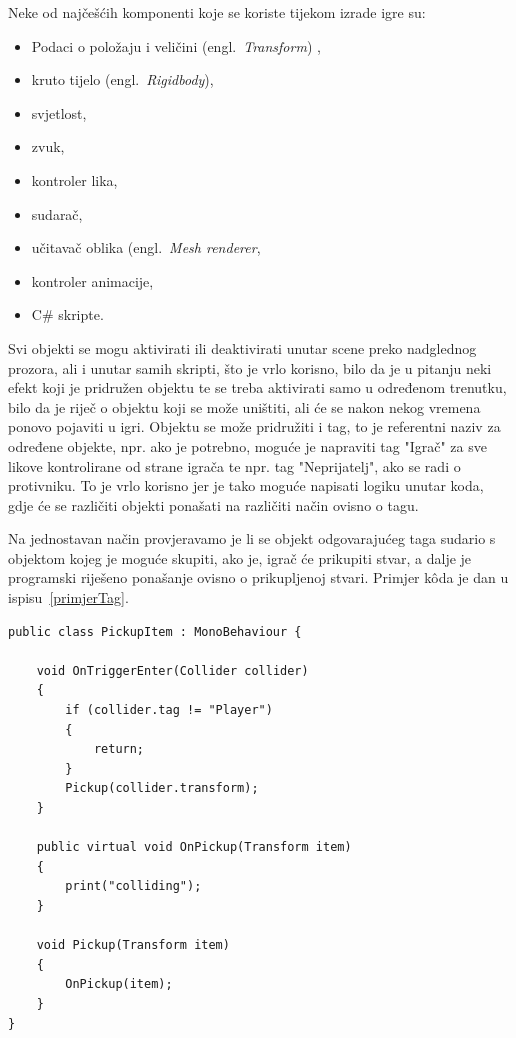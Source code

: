 Neke od najčešćih komponenti koje se koriste tijekom izrade igre su:
\begin{itemize}
  \item Podaci o položaju i veličini (engl.~\textit{Transform}) ,
  \item kruto tijelo (engl.~\textit{Rigidbody}),
  \item svjetlost,
  \item zvuk,
  \item kontroler lika,
  \item sudarač,
  \item učitavač oblika (engl.~\textit{Mesh renderer},
  \item kontroler animacije,
  \item C\# skripte.
\end{itemize}

Svi objekti se mogu aktivirati ili deaktivirati unutar scene preko nadglednog prozora, ali i unutar samih skripti, što je vrlo korisno, bilo da je u pitanju neki efekt koji je pridružen objektu te se treba aktivirati samo u određenom trenutku, bilo da je riječ o objektu koji se može uništiti, ali će se nakon nekog vremena ponovo pojaviti u igri.
Objektu se može pridružiti i tag, to je referentni naziv za određene objekte, npr. ako je potrebno, moguće je napraviti tag "Igrač" za sve likove kontrolirane od strane igrača te npr. tag "Neprijatelj", ako se radi o protivniku. To je vrlo korisno jer je tako moguće napisati logiku unutar koda, gdje će se različiti objekti ponašati na različiti način ovisno o tagu.

Na jednostavan način provjeravamo je li se objekt odgovarajućeg taga sudario s objektom kojeg je moguće skupiti, ako je, igrač će prikupiti stvar, a dalje je programski riješeno ponašanje ovisno o prikupljenoj stvari. Primjer k\^oda je dan u ispisu~\ref{primjerTag}. 

\begin{lstlisting}[caption={Uporaba taga}, label=primjerTag]
public class PickupItem : MonoBehaviour {

    void OnTriggerEnter(Collider collider)
    {
        if (collider.tag != "Player")
        {
            return;
        }
        Pickup(collider.transform);
    }

    public virtual void OnPickup(Transform item)
    {
        print("colliding");
    }

    void Pickup(Transform item)
    {
        OnPickup(item);
    }
}
\end{lstlisting}


